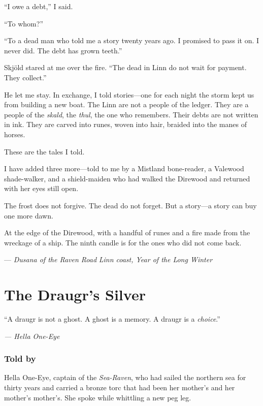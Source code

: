 \documentclass[9pt,a5paper]{extbook}
\begin{document}
``I owe a debt,'' I said.

``To whom?''

``To a dead man who told me a story twenty years ago. I promised to pass it on. I never did. The debt has grown teeth.''

Skjöld stared at me over the fire. ``The dead in Linn do not wait for payment. They collect.''

He let me stay. In exchange, I told stories---one for each night the storm kept us from building a new boat. The Linn are not a people of the ledger. They are a people of the \textit{skald}, the \textit{thul}, the one who remembers. Their debts are not written in ink. They are carved into runes, woven into hair, braided into the manes of horses.

These are the tales I told.

I have added three more---told to me by a Mistland bone-reader, a Valewood shade-walker, and a shield-maiden who had walked the Direwood and returned with her eyes still open.

The frost does not forgive. The dead do not forget. But a story---a story can buy one more dawn.

At the edge of the Direwood, with a handful of runes and a fire made from the wreckage of a ship. The ninth candle is for the ones who did not come back.

\hfill --- \textit{Dusana of the Raven Road}
\vspace{0.5cm}
\hfill \textit{Linn coast, Year of the Long Winter}

\clearpage

\tableofcontents
\clearpage

\mainmatter

\chapter{The Draugr's Silver}

\epigraph{``A draugr is not a ghost. A ghost is a memory. A draugr is a \textit{choice}.''}{\textit{--- Hella One-Eye}}

\subsection*{Told by}

Hella One-Eye, captain of the \textit{Sea-Raven}, who had sailed the northern sea for thirty years and carried a bronze torc that had been her mother's and her mother's mother's. She spoke while whittling a new peg leg.
\end{document}
